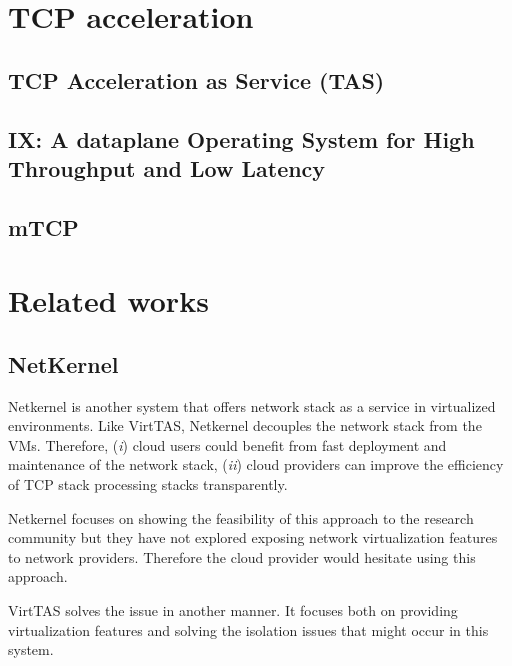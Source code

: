\section{TCP acceleration}

\subsection{TCP Acceleration as Service (TAS)}


\subsection{IX: A dataplane Operating System for High Throughput and Low Latency}


\subsection{mTCP}


\section{Related works}
\subsection{NetKernel}
Netkernel is another system that offers network stack as a service in virtualized 
environments. Like VirtTAS, Netkernel decouples the network stack from the VMs. Therefore, 
(\emph{i}) cloud users could benefit from fast deployment and maintenance of the network 
stack, (\emph{ii}) cloud providers can improve the efficiency of TCP stack processing stacks 
transparently. 

Netkernel focuses on showing the feasibility of this approach to the research community but 
they have not explored exposing network virtualization features to network providers. 
Therefore the cloud provider would hesitate using this approach. %

VirtTAS solves the issue in another manner. It focuses both on providing virtualization 
features and solving the isolation issues that might occur in this system. %